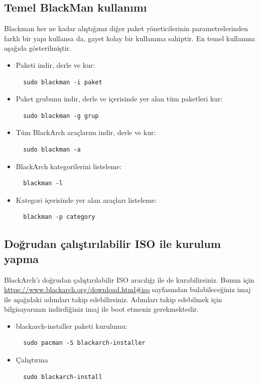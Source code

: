 \documentclass[a4paper, oneside, 11pt]{book}
\begin{document}
\subsection{Temel BlackMan kullanımı}
Blackman her ne kadar alıştığınız diğer paket yöneticilerinin parametrelerinden farklı bir yapı kullansa da, gayet kolay bir kullanıma sahiptir. En temel kullanımı aşağıda gösterilmiştir.

\begin{itemize}
\item Paketi indir, derle ve kur:
\begin{lstlisting}
  sudo blackman -i paket
\end{lstlisting}

\item Paket grubunu indir, derle ve içerisinde yer alan tüm paketleri kur:
\begin{lstlisting}
  sudo blackman -g grup
\end{lstlisting}

\item Tüm BlackArch araçlarını indir, derle ve kur:
\begin{lstlisting}
  sudo blackman -a
\end{lstlisting}

\item BlackArch kategorilerini listeleme:
\begin{lstlisting}
  blackman -l
\end{lstlisting}

\item Kategori içerisinde yer alan araçları listeleme:
\begin{lstlisting}
  blackman -p category
\end{lstlisting}

\end{itemize}

\subsection{Doğrudan çalıştırılabilir ISO ile kurulum yapma}
BlackArch'ı doğrudan çalıştırılabilir ISO aracılığı ile de kurabilirsiniz. Bunun için \url{https://www.blackarch.org/download.html#iso} sayfasından bulabileceğiniz imaj ile aşağıdaki adımları takip edebilirsiniz. Adımları takip edebilmek için bilgisayarınızı indirdiğiniz imaj ile boot etmeniz gerekmektedir.

\begin{itemize}
\item blackarch-installer paketi kurulumu:
\begin{lstlisting}
  sudo pacman -S blackarch-installer
\end{lstlisting}

\item Çalıştırma
\begin{lstlisting}
  sudo blackarch-install
\end{lstlisting}

\end{itemize}
\end{document}
